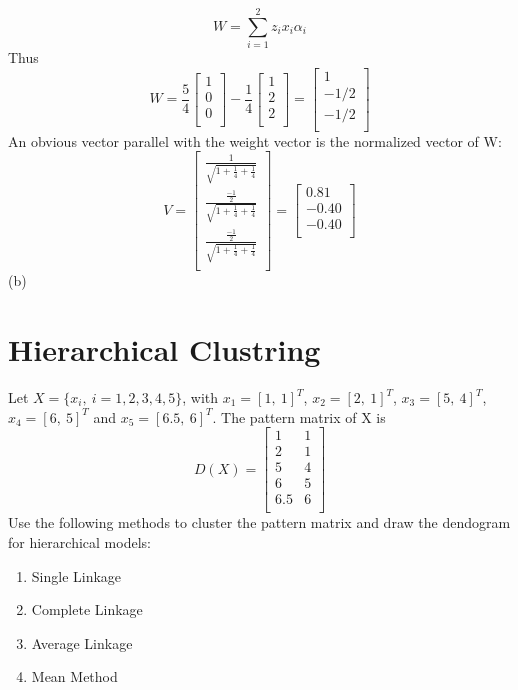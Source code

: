 \documentclass[12pt]{article}
\numberwithin{equation}{section}
\numberwithin{table}{section}
\numberwithin{figure}{section}
\begin{document}
\begin{equation}
	W = \sum_{i = 1}^{2}z_ix_i\alpha_i
\end{equation}
Thus
$$
	W = \frac{5}{4}\begin{bmatrix}
	1 \\
	0 \\
	0 \\
	\end{bmatrix} - \frac{1}{4}\begin{bmatrix}
	1 \\
	2 \\
	2 \\
	\end{bmatrix} = \begin{bmatrix}
	1 \\
	-1/2 \\
	-1/2 \\
	\end{bmatrix}
$$
An obvious vector parallel with the weight vector is the normalized vector of W:
$$
	V = \begin{bmatrix}
	\frac{1}{\sqrt{1 + \frac{1}{4} + \frac{1}{4}}} \\
	\frac{\frac{-1}{2}}{\sqrt{1 + \frac{1}{4} + \frac{1}{4}}} \\
	\frac{\frac{-1}{2}}{\sqrt{1 + \frac{1}{4} + \frac{1}{4}}} \\	
	\end{bmatrix} = \begin{bmatrix}
	 0.81 \\
	-0.40 \\
	-0.40 \\	
	\end{bmatrix}
$$
(b)
\section{Hierarchical Clustring}
Let $X = \{x_i,\ i = 1, 2, 3, 4, 5 \}$, with $x_1 = [1,\ 1]^T$, $x_2 = [2,\ 1]^T$, $x_3 = [5,\ 4]^T$, $x_4 = [6,\ 5]^T$ and $x_5 = [6.5,\ 6]^T$. The pattern matrix of X is
$$
	D(X) = \begin{bmatrix}
	1 & 1\\
	2 & 1\\
	5 & 4\\
	6 & 5\\
	6.5 & 6\\
	\end{bmatrix}
$$
Use the following methods to cluster the pattern matrix and draw the dendogram for hierarchical models:
\begin{enumerate}[label=(\alph*)]
	\item Single Linkage
	\item Complete Linkage
	\item Average Linkage
	\item Mean Method
\end{enumerate}
\end{document}
